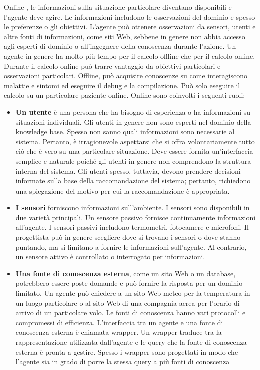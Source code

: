 \documentclass[a4paper]{extarticle}
\begin{document}
Online , le informazioni sulla situazione particolare diventano disponibili e l'agente deve agire. Le informazioni includono le osservazioni del dominio e spesso le preferenze o gli obiettivi. L'agente può ottenere osservazioni da sensori, utenti e altre fonti di informazioni, come siti Web, sebbene in genere non abbia accesso agli esperti di dominio o all'ingegnere della conoscenza durante l'azione. Un agente in genere ha molto più tempo per il calcolo offline che per il calcolo online. Durante il calcolo online può trarre vantaggio da obiettivi particolari e osservazioni particolari. Offline, può acquisire conoscenze su come interagiscono malattie e sintomi ed eseguire il debug e la compilazione. Può solo eseguire il calcolo su un particolare paziente online. Online sono coinvolti i seguenti ruoli:
\begin{itemize}
\item  \textbf{Un utente} è una persona che ha bisogno di esperienza o ha informazioni su situazioni individuali. Gli utenti in genere non sono esperti nel dominio della knowledge base. Spesso non sanno quali informazioni sono necessarie al sistema. Pertanto, è irragionevole aspettarsi che si offra volontariamente tutto ciò che è vero su una particolare situazione. Deve essere fornita un'interfaccia semplice e naturale poiché gli utenti in genere non comprendono la struttura interna del sistema. Gli utenti spesso, tuttavia, devono prendere decisioni informate sulla base della raccomandazione del sistema; pertanto, richiedono una spiegazione del motivo per cui la raccomandazione è appropriata.
\item \textbf{I sensori} forniscono informazioni sull'ambiente. I sensori sono disponibili in due varietà principali. Un sensore passivo fornisce continuamente informazioni all'agente. I sensori passivi includono termometri, fotocamere e microfoni. Il progettista può in genere scegliere dove si trovano i sensori o dove stanno puntando, ma si limitano a fornire le informazioni sull'agente. Al contrario, un sensore attivo è controllato o interrogato per informazioni.
\item  \textbf{Una fonte di conoscenza esterna}, come un sito Web o un database, potrebbero essere poste domande e può fornire la risposta per un dominio limitato. Un agente può chiedere a un sito Web meteo per la temperatura in un luogo particolare o al sito Web di una compagnia aerea per l'orario di arrivo di un particolare volo. Le fonti di conoscenza hanno vari protocolli e compromessi di efficienza. L'interfaccia tra un agente e una fonte di conoscenza esterna è chiamata wrapper. Un wrapper traduce tra la rappresentazione utilizzata dall'agente e le query che la fonte di conoscenza esterna è pronta a gestire. Spesso i wrapper sono progettati in modo che l'agente sia in grado di porre la stessa query a più fonti di conoscenza
\end{itemize}
\end{document}
